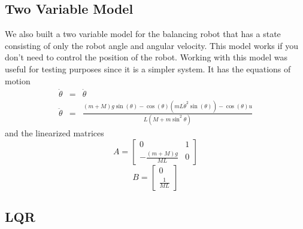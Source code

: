 \documentclass[]{article}
\begin{document}
\subsection*{Two Variable Model}
We also built a two variable model for the balancing robot that has a state consisting of only the robot angle and angular velocity. This model works if you don't need to control the position of the robot. Working with this model was useful for testing purposes since it is a simpler system. It has the equations of motion
\begin{eqnarray*}
	\dot{\theta}  &= & \dot{\theta} \\	
	\ddot{\theta}  &= & \frac{(m+M)g\sin(\theta)-\cos(\theta)(mL{\dot{\theta}}^2\sin(\theta))-\cos(\theta)u}{L(M+m\sin^2\theta)} 
\end{eqnarray*}
and the linearized matrices
\begin{equation*}
		A = 
\begin{bmatrix}
	0                          & 1 \\
	-\frac{(m+M)g}{ML} & 0
\end{bmatrix}
\end{equation*}
\begin{equation*}
	B = 
	\begin{bmatrix}
		0  \\
		\frac{1}{ML}   
	\end{bmatrix}
\end{equation*}

\subsection*{LQR}
\end{document}
